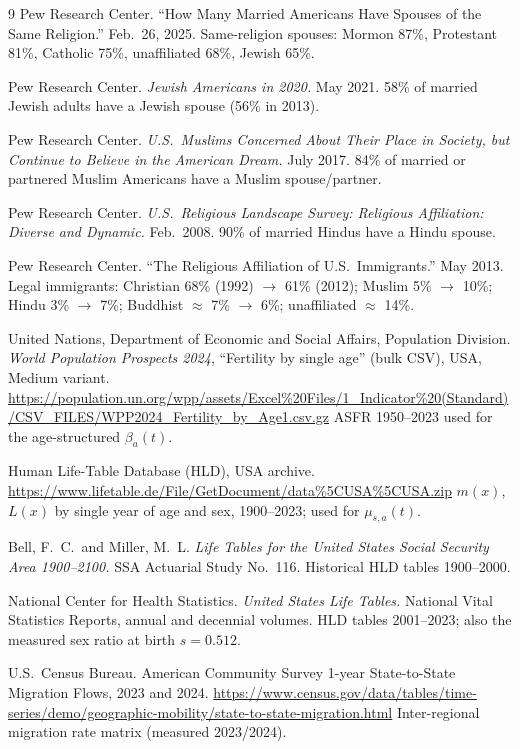 \documentclass[11pt,a4paper]{article}
\begin{document}
{\begin{thebibliography}{9}
Pew Research Center. ``How Many Married Americans Have Spouses of the Same
Religion.'' Feb.\ 26, 2025.  Same-religion spouses: Mormon 87\%,
Protestant 81\%, Catholic 75\%, unaffiliated 68\%, Jewish 65\%.

Pew Research Center. \textit{Jewish Americans in 2020.} May 2021.  58\% of
married Jewish adults have a Jewish spouse (56\% in 2013).

Pew Research Center. \textit{U.S.\ Muslims Concerned About Their Place in
Society, but Continue to Believe in the American Dream.} July 2017.  84\%
of married or partnered Muslim Americans have a Muslim spouse/partner.

Pew Research Center. \textit{U.S.\ Religious Landscape Survey: Religious
Affiliation: Diverse and Dynamic.} Feb.\ 2008.  90\% of married Hindus have
a Hindu spouse.

Pew Research Center. ``The Religious Affiliation of U.S.\ Immigrants.'' May
2013.  Legal immigrants: Christian 68\% (1992) $\to$ 61\% (2012); Muslim
5\% $\to$ 10\%; Hindu 3\% $\to$ 7\%; Buddhist $\approx$ 7\% $\to$ 6\%;
unaffiliated $\approx$ 14\%.

United Nations, Department of Economic and Social Affairs, Population
Division. \textit{World Population Prospects 2024}, ``Fertility by single
age'' (bulk CSV), USA, Medium variant.
\url{https://population.un.org/wpp/assets/Excel\%20Files/1_Indicator\%20(Standard)/CSV_FILES/WPP2024_Fertility_by_Age1.csv.gz}
ASFR 1950--2023 used for the age-structured $\beta_a(t)$.

Human Life-Table Database (HLD), USA archive.
\url{https://www.lifetable.de/File/GetDocument/data\%5CUSA\%5CUSA.zip}
$m(x)$, $L(x)$ by single year of age and sex, 1900--2023; used for
$\mu_{s,a}(t)$.

Bell, F.~C.\ and Miller, M.~L. \textit{Life Tables for the United States
Social Security Area 1900--2100.} SSA Actuarial Study No.~116.
Historical HLD tables 1900--2000.

National Center for Health Statistics. \textit{United States Life
Tables.} National Vital Statistics Reports, annual and decennial volumes.
HLD tables 2001--2023; also the measured sex ratio at birth $s=0.512$.

U.S.\ Census Bureau. American Community Survey 1-year State-to-State
Migration Flows, 2023 and 2024.
\url{https://www.census.gov/data/tables/time-series/demo/geographic-mobility/state-to-state-migration.html}
Inter-regional migration rate matrix (measured 2023/2024).


\end{thebibliography}}
\end{document}
